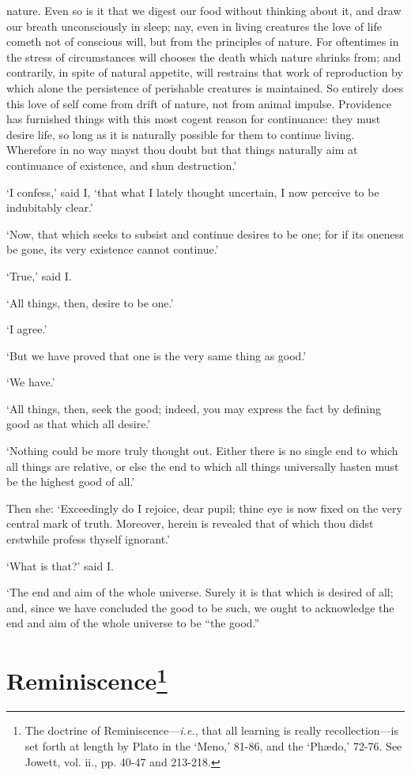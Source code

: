 \documentclass[11pt]{book}
\begin{document}
nature. Even so is it that we digest our food without thinking about it,
and draw our breath unconsciously in sleep; nay, even in living
creatures the love of life cometh not of conscious will, but from the
principles of nature. For oftentimes in the stress of circumstances will
chooses the death which nature shrinks from; and contrarily, in spite of
natural appetite, will restrains that work of reproduction by which
alone the persistence of perishable creatures is maintained. So entirely
does this love of self come from drift of nature, not from animal
impulse. Providence has furnished things with this most cogent reason
for continuance: they must desire life, so long as it is naturally
possible for them to continue living. Wherefore in no way mayst thou
doubt but that things naturally aim at continuance of existence, and
shun destruction.'

`I confess,' said I, `that what I lately thought uncertain, I now
perceive to be indubitably clear.'

`Now, that which seeks to subsist and continue desires to be one; for if
its oneness be gone, its very existence cannot continue.'

`True,' said I.

`All things, then, desire to be one.'

`I agree.'

`But we have proved that one is the very same thing as good.'

`We have.'

`All things, then, seek the good; indeed, you may express the fact by
defining good as that which all desire.'

`Nothing could be more truly thought out. Either there is no single end
to which all things are relative, or else the end to which all things
universally hasten must be the highest good of all.'

Then she: `Exceedingly do I rejoice, dear pupil; thine eye is now fixed
on the very central mark of truth. Moreover, herein is revealed that of
which thou didst erstwhile profess thyself ignorant.'

`What is that?' said I.

`The end and aim of the whole universe. Surely it is that which is
desired of all; and, since we have concluded the good to be such, we
ought to acknowledge the end and aim of the whole universe to be ``the
good.''



\section{Reminiscence\footnote{The doctrine of
Reminiscence---\emph{i.e.}, that all learning is really recollection---is
set forth at length by Plato in the `Meno,' 81-86, and the `Phædo,'
72-76. See Jowett, vol. ii., pp. 40-47 and 213-218.}}
\end{document}
